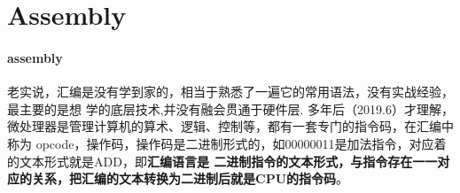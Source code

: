 \clearpage
\part{Assembly}


\subsection{assembly}
老实说，汇编是没有学到家的，相当于熟悉了一遍它的常用语法，没有实战经验，最主要的是想
学的底层技术,并没有融会贯通于硬件层.
\newline
多年后（2019.6）才理解，微处理器是管理计算机的算术、逻辑、控制等，都有一套专门的指令码，在汇编中称为
opcode，操作码，操作码是二进制形式的，如00000011是加法指令，对应着的文本形式就是ADD，即\textbf{汇编语言是
二进制指令的文本形式，与指令存在一一对应的关系，把汇编的文本转换为二进制后就是CPU的指令码}。

